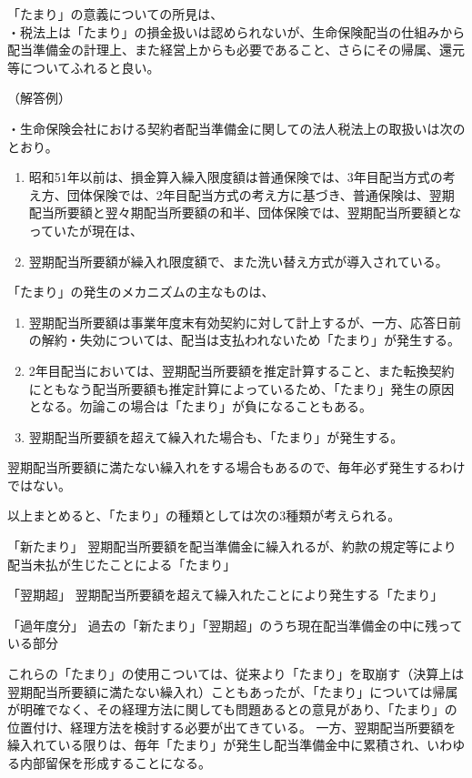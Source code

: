 \documentclass[report,gutter=10mm,fore-edge=10mm,uplatex,dvipdfmx]{jlreq}
\begin{document}
「たまり」の意義についての所見は、\\
・税法上は「たまり」の損金扱いは認められないが、生命保険配当の仕組みから配当準備金の計理上、また経営上からも必要であること、さらにその帰属、還元等についてふれると良い。

（解答例）

・生命保険会社における契約者配当準備金に関しての法人税法上の取扱いは次のとおり。
\begin{enumerate} [1) ]
\item 昭和51年以前は、損金算入繰入限度額は普通保険では、3年目配当方式の考え方、団体保険では、2年目配当方式の考え方に基づき、普通保険は、翌期配当所要額と翌々期配当所要額の和半、団体保険では、翌期配当所要額となっていたが現在は、
\item 翌期配当所要額が繰入れ限度額で、また洗い替え方式が導入されている。
\end{enumerate}

「たまり」の発生のメカニズムの主なものは、
\begin{enumerate} [1) ]
\item 翌期配当所要額は事業年度末有効契約に対して計上するが、一方、応答日前の解約・失効については、配当は支払われないため「たまり」が発生する。
\item 2年目配当においては、翌期配当所要額を推定計算すること、また転換契約にともなう配当所要額も推定計算によっているため、「たまり」発生の原因となる。勿論この場合は「たまり」が負になることもある。
\item 翌期配当所要額を超えて繰入れた場合も、「たまり」が発生する。
\end{enumerate}

翌期配当所要額に満たない繰入れをする場合もあるので、毎年必ず発生するわけではない。

以上まとめると、「たまり」の種類としては次の3種類が考えられる。

「新たまり」 翌期配当所要額を配当準備金に繰入れるが、約款の規定等により配当未払が生じたことによる「たまり」

「翌期超」 翌期配当所要額を超えて繰入れたことにより発生する「たまり」

「過年度分」 過去の「新たまり」「翌期超」のうち現在配当準備金の中に残っている部分

これらの「たまり」の使用こついては、従来より「たまり」を取崩す（決算上は翌期配当所要額に満たない繰入れ）こともあったが、「たまり」については帰属が明確でなく、その経理方法に関しても問題あるとの意見があり、「たまり」の位置付け、経理方法を検討する必要が出てきている。
一方、翌期配当所要額を繰入れている限りは、毎年「たまり」が発生し配当準備金中に累積され、いわゆる内部留保を形成することになる。
\end{document}
